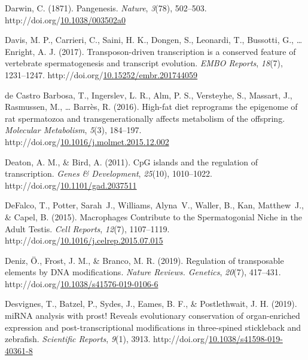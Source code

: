 \documentclass[12pt,twoside]{reedthesis}
\newlength{\cslhangindent}
\newenvironment{CSLReferences}[2] %
 {%
  \setlength{\parindent}{0pt}
  \ifodd #1 \everypar{\setlength{\hangindent}{\cslhangindent}}\ignorespaces\fi
  \ifnum #2 > 0
  \setlength{\parskip}{#2\baselineskip}
  \fi
 }%
 {}
\begin{document}
\begin{CSLReferences}{1}{0}
\leavevmode{}%
Darwin, C. (1871). Pangenesis. \emph{Nature}, \emph{3}(78), 502--503. http://doi.org/\href{https://doi.org/10.1038/003502a0}{10.1038/003502a0}

\leavevmode{}%
Davis, M. P., Carrieri, C., Saini, H. K., Dongen, S., Leonardi, T., Bussotti, G., \ldots{} Enright, A. J. (2017). Transposon{-}driven transcription is a conserved feature of vertebrate spermatogenesis and transcript evolution. \emph{EMBO Reports}, \emph{18}(7), 1231--1247. http://doi.org/\href{https://doi.org/10.15252/embr.201744059}{10.15252/embr.201744059}

\leavevmode{}%
de Castro Barbosa, T., Ingerslev, L. R., Alm, P. S., Versteyhe, S., Massart, J., Rasmussen, M., \ldots{} Barrès, R. (2016). High-fat diet reprograms the epigenome of rat spermatozoa and transgenerationally affects metabolism of the offspring. \emph{Molecular Metabolism}, \emph{5}(3), 184--197. http://doi.org/\href{https://doi.org/10.1016/j.molmet.2015.12.002}{10.1016/j.molmet.2015.12.002}

\leavevmode{}%
Deaton, A. M., \& Bird, A. (2011). CpG islands and the regulation of transcription. \emph{Genes \& Development}, \emph{25}(10), 1010--1022. http://doi.org/\href{https://doi.org/10.1101/gad.2037511}{10.1101/gad.2037511}

\leavevmode{}%
DeFalco, T., Potter, Sarah~J., Williams, Alyna~V., Waller, B., Kan, Matthew~J., \& Capel, B. (2015). Macrophages Contribute to the Spermatogonial Niche in the Adult Testis. \emph{Cell Reports}, \emph{12}(7), 1107--1119. http://doi.org/\href{https://doi.org/10.1016/j.celrep.2015.07.015}{10.1016/j.celrep.2015.07.015}

\leavevmode{}%
Deniz, Ö., Frost, J. M., \& Branco, M. R. (2019). Regulation of transposable elements by DNA modifications. \emph{Nature Reviews. Genetics}, \emph{20}(7), 417--431. http://doi.org/\href{https://doi.org/10.1038/s41576-019-0106-6}{10.1038/s41576-019-0106-6}

\leavevmode{}%
Desvignes, T., Batzel, P., Sydes, J., Eames, B. F., \& Postlethwait, J. H. (2019). miRNA analysis with prost! Reveals evolutionary conservation of organ-enriched expression and post-transcriptional modifications in three-spined stickleback and zebrafish. \emph{Scientific Reports}, \emph{9}(1), 3913. http://doi.org/\href{https://doi.org/10.1038/s41598-019-40361-8}{10.1038/s41598-019-40361-8}


\end{CSLReferences}
\end{document}
